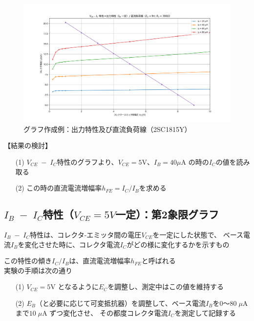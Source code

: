 \documentclass[uplatex,a4paper,11pt,oneside,openany]{jsbook}
\begin{document}
\newpage

\begin{figure}[H]
  \centering
   \includegraphics[keepaspectratio, scale=0.45, angle=0]
               {figs/png/x1static.png}
               \caption{グラフ作成例：出力特性及び直流負荷線（2SC1815Y）}
               \label{fig:iocharM1Yd}
\end{figure}

【結果の検討】

\begin{enumerate}
\item[(1)] $V_{CE}\;-\;I_C$特性のグラフより、$V_{CE}=5$V、$I_B=40\mu$A の時の$I_C$の値を読み取る\\
\item[(2)] この時の直流電流増幅率$h_{FE}=I_C/I_B$を求める
\end{enumerate}

\newpage

\subsection{$I_B\;-\;I_C$特性（$V_{CE}=5V$一定）：第2象限グラフ}

$I_B\;-\;I_C$特性は、コレクタ-エミッタ間の電圧$V_{CE}$を一定にした状態で、
ベース電流$I_B$を変化させた時に、コレクタ電流$I_C$がどの様に変化するかを示すもの

この特性の傾き$I_C/I_B$は、直流電流増幅率$h_{FE}$と呼ばれる\\

実験の手順は次の通り

\begin{enumerate}
\item[(1)] $V_{CE}=5$V となるように$E_C$を調整し、測定中はこの値を維持する
\item[(2)] $E_B$（と必要に応じて可変抵抗器）を調整して、ベース電流$I_B$を$0$〜$80\;\mu$A まで$10\;\mu$A ずつ変化させ、
その都度コレクタ電流$I_C$を測定して記録する 
\end{enumerate}
\end{document}
